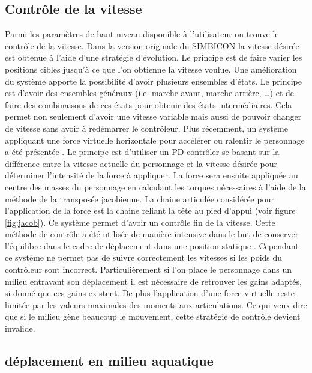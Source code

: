 \documentclass{llncs}
\begin{document}
\subsection{Contrôle de la vitesse}
Parmi les paramètres de haut niveau disponible à l'utilisateur on trouve le contrôle de la vitesse. Dans la version originale du SIMBICON la vitesse désirée est obtenue à l'aide d'une stratégie d'évolution. Le principe est de faire varier les positions cibles jusqu'à ce que l'on obtienne la vitesse voulue. Une amélioration du système \cite{coros2009robust} apporte la possibilité d'avoir plusieurs ensembles d'états. Le principe est d'avoir des ensembles généraux (i.e. marche avant, marche arrière, …) et de faire des combinaisons de ces états pour obtenir des états intermédiaires. Cela permet non seulement d'avoir une vitesse variable mais aussi de pouvoir changer de vitesse sans avoir à redémarrer le contrôleur.
Plus récemment, un système appliquant une force virtuelle horizontale pour accélérer ou ralentir le personnage a été présentée \cite{coros2010generalized}. Le principe est d'utiliser un PD-contrôler se basant sur la différence entre la vitesse actuelle du personnage et la vitesse désirée pour déterminer l'intensité de la force à appliquer. La force sera ensuite appliquée au centre des masses du personnage en calculant les torques nécessaires à l'aide de la méthode de la transposée jacobienne.  La chaine articulée considérée pour l'application de la force est la chaine reliant la tête au pied d'appui (voir figure \ref{fig:jacob}). Ce système permet d'avoir un contrôle fin de la vitesse. Cette méthode de contrôle a été utilisée de manière intensive dans le but de conserver l'équilibre dans le cadre de déplacement dans une position statique \cite{geijtenbeek2012simple}. Cependant ce système ne permet pas de suivre correctement les vitesses si les poids du contrôleur sont incorrect. Particulièrement si l'on place le personnage dans un milieu entravant son déplacement il est nécessaire de retrouver les gains adaptés, si donné que ces gains existent. De plus l'application d'une force virtuelle reste limitée par les valeurs maximales des moments aux articulations. Ce qui veux dire que si le milieu gène beaucoup le mouvement, cette stratégie de contrôle devient invalide.

\subsection{déplacement en milieu aquatique}
\end{document}
